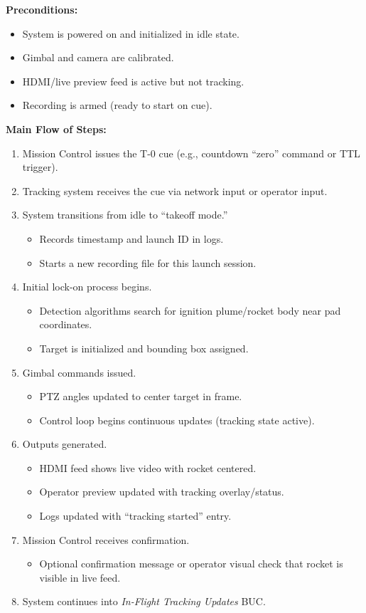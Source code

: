\documentclass[12pt]{article}
\begin{document}
\textbf{Preconditions:}
\begin{itemize}
  \item System is powered on and initialized in idle state.
  \item Gimbal and camera are calibrated.
  \item HDMI/live preview feed is active but not tracking.
  \item Recording is armed (ready to start on cue).
\end{itemize}

\textbf{Main Flow of Steps:}
\begin{enumerate}
  \item Mission Control issues the T-0 cue (e.g., countdown ``zero'' command or TTL
        trigger).
  \item Tracking system receives the cue via network input or operator input.
  \item System transitions from idle to ``takeoff mode.''
        \begin{itemize}
          \item Records timestamp and launch ID in logs.
          \item Starts a new recording file for this launch session.
        \end{itemize}
  \item Initial lock-on process begins.
        \begin{itemize}
          \item Detection algorithms search for ignition plume/rocket body near pad
                coordinates.
          \item Target is initialized and bounding box assigned.
        \end{itemize}
  \item Gimbal commands issued.
        \begin{itemize}
          \item PTZ angles updated to center target in frame.
          \item Control loop begins continuous updates (tracking state active).
        \end{itemize}
  \item Outputs generated.
        \begin{itemize}
          \item HDMI feed shows live video with rocket centered.
          \item Operator preview updated with tracking overlay/status.
          \item Logs updated with ``tracking started'' entry.
        \end{itemize}
  \item Mission Control receives confirmation.
        \begin{itemize}
          \item Optional confirmation message or operator visual check that rocket is visible
                in live feed.
        \end{itemize}
  \item System continues into \emph{In-Flight Tracking Updates} BUC.
\end{enumerate}
\end{document}
